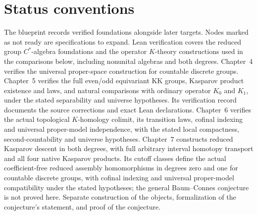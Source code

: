 \section{Status conventions}
The blueprint records verified foundations alongside later targets.
Nodes marked as not ready are specifications to expand. Lean verification
covers the reduced group $C^*$-algebra foundations and the operator
$K$-theory constructions used in the comparisons below, including nonunital
algebras and both degrees. Chapter~4 verifies the universal proper-space
construction for countable discrete groups. Chapter~5 verifies the full
even/odd equivariant KK groups, Kasparov product existence and laws, and
natural comparisons with ordinary operator $K_0$ and $K_1$, under the
stated separability and universe hypotheses. Its verification record
documents the source corrections and exact Lean declarations.
Chapter~6 verifies the actual topological $K$-homology colimit, its transition
laws, cofinal indexing and universal proper-model independence, with the stated
local compactness, second-countability and universe hypotheses.
Chapter~7 constructs reduced Kasparov descent in both degrees, with full
arbitrary interval homotopy transport and all four native Kasparov products.
Its cutoff classes define the actual coefficient-free reduced assembly
homomorphisms in degrees zero and one for countable discrete groups, with
cofinal indexing and universal proper-model compatibility under the stated
hypotheses; the general Baum--Connes conjecture is not proved here. Separate construction
of the objects, formalization of the conjecture's statement, and proof of
the conjecture.
